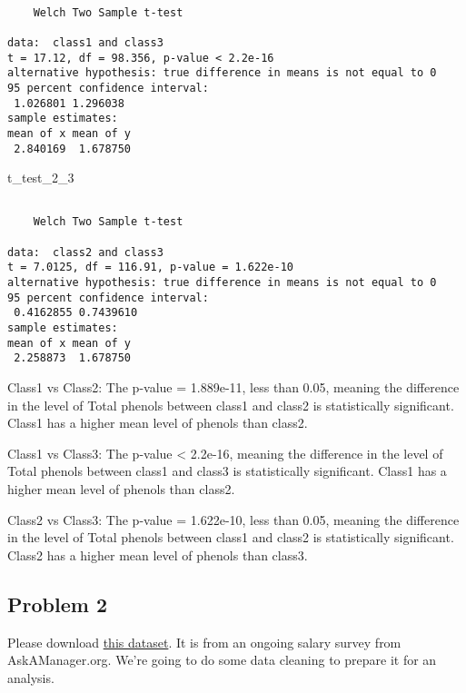 \documentclass[
  letterpaper,
  DIV=11,
  numbers=noendperiod]{scrartcl}
\newenvironment{Shaded}{\begin{snugshade}}{\end{snugshade}}
\newcommand{\NormalTok}[1]{\textcolor[rgb]{0.00,0.23,0.31}{#1}}
\begin{document}
\begin{verbatim}

    Welch Two Sample t-test

data:  class1 and class3
t = 17.12, df = 98.356, p-value < 2.2e-16
alternative hypothesis: true difference in means is not equal to 0
95 percent confidence interval:
 1.026801 1.296038
sample estimates:
mean of x mean of y 
 2.840169  1.678750 
\end{verbatim}

\begin{Shaded}
\begin{Highlighting}[]
\NormalTok{t\_test\_2\_3}
\end{Highlighting}
\end{Shaded}

\begin{verbatim}

    Welch Two Sample t-test

data:  class2 and class3
t = 7.0125, df = 116.91, p-value = 1.622e-10
alternative hypothesis: true difference in means is not equal to 0
95 percent confidence interval:
 0.4162855 0.7439610
sample estimates:
mean of x mean of y 
 2.258873  1.678750 
\end{verbatim}

Class1 vs Class2: The p-value = 1.889e-11, less than 0.05, meaning the
difference in the level of Total phenols between class1 and class2 is
statistically significant. Class1 has a higher mean level of phenols
than class2.

Class1 vs Class3: The p-value \textless{} 2.2e-16, meaning the
difference in the level of Total phenols between class1 and class3 is
statistically significant. Class1 has a higher mean level of phenols
than class2.

Class2 vs Class3: The p-value = 1.622e-10, less than 0.05, meaning the
difference in the level of Total phenols between class1 and class2 is
statistically significant. Class2 has a higher mean level of phenols
than class3.

\subsection{Problem 2}\label{problem-2}

Please download
\href{https://dept.stat.lsa.umich.edu/~jerrick/courses/stat506_f24/data/AskAManager.csv}{this
dataset}. It is from an ongoing salary survey from AskAManager.org.
We're going to do some data cleaning to prepare it for an analysis.
\end{document}

